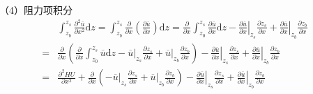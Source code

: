 （4）阻力项积分
\begin{equation}
  \begin{aligned}
    &\int_{z_{b}}^{ z_{s}}\!
    \frac{\partial^{2} \overline{u}}{\partial x^{2}}
    \mathrm{d}z
    =
    \int_{z_{b}}^{ z_{s}}\!
    \frac{\partial}{\partial x}
    \left(\frac{\partial \overline{u}}{\partial x}\right)
    \mathrm{d}z
    =
    \frac{\partial}{\partial x}
    \int_{z_0}^{ z_{s}}\!
    \frac{\partial \overline{u}}{\partial x}
    \mathrm{d}z
    -
    \left.\frac{\partial \overline{u}}{\partial x}\right|_{z_{s}}\frac{\partial  z_{s}}{\partial x}
    +
    \left.\frac{\partial \overline{u}}{\partial x}\right|_{z_{b}}\frac{\partial z_{b}}{\partial x}
    \\
    =&
    \frac{\partial}{\partial x}
    \left(
    \frac{\partial}{\partial x}
    \int_{z_0}^{ z_{s}}\!
    \overline{u}
    \mathrm{d}z
    -
    \left.\overline{u}\right|_{z_{s}}\frac{\partial  z_{s}}{\partial x}
    +
    \left.\overline{u}\right|_{z_{b}}\frac{\partial z_{b}}{\partial x}
    \right)
    -
    \left.\frac{\partial \overline{u}}{\partial x}\right|_{z_{s}}\frac{\partial  z_{s}}{\partial x}
    +
    \left.\frac{\partial \overline{u}}{\partial x}\right|_{z_{b}}\frac{\partial z_{b}}{\partial x}
    \\
    =&
    \frac{\partial^{2} HU}{\partial x^{2}} +
    \frac{\partial}{\partial x}
    \left(
    -
    \left.\overline{u}\right|_{z_{s}}\frac{\partial  z_{s}}{\partial x}
    +
    \left.\overline{u}\right|_{z_{b}}\frac{\partial z_{b}}{\partial x}
    \right)
    -
    \left.\frac{\partial \overline{u}}{\partial x}\right|_{z_{s}}\frac{\partial  z_{s}}{\partial x}
    +
    \left.\frac{\partial \overline{u}}{\partial x}\right|_{z_{b}}\frac{\partial z_{b}}{\partial x}
  \end{aligned}
  \label{EqCGe_Shear_1}
\end{equation}

